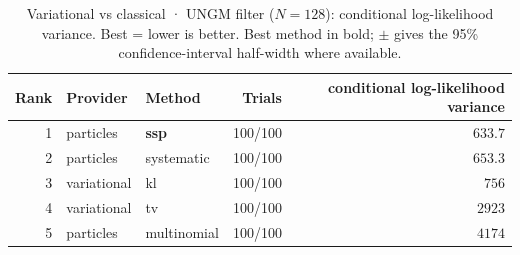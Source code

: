 \begin{table}[!htbp]
\centering
\small
\caption{Variational vs classical · UNGM filter ($N=128$): conditional log-likelihood variance. Best = lower is better. Best method in bold; $\pm$ gives the 95\% confidence-interval half-width where available.}
\label{tab:variational-vs-classical-ungm-filter-conditional-loglik-variance}
\begin{tabular}{rllrr}
\toprule
Rank & Provider & Method & Trials & conditional log-likelihood variance \\
\midrule
1 & particles & \textbf{ssp} & 100/100 & $\mathbf{633.7}$ \\
2 & particles & systematic & 100/100 & $653.3$ \\
3 & variational & kl & 100/100 & $756$ \\
4 & variational & tv & 100/100 & $2923$ \\
5 & particles & multinomial & 100/100 & $4174$ \\
\bottomrule
\end{tabular}
\end{table}
